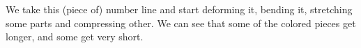 \documentclass[]{standalone}
\begin{document}
\begin{minipage}{30ex}
    We take this (piece of) number line and start deforming it, bending it,
    stretching some parts and compressing other.  We can see that some of the
    colored pieces get longer, and some get very short.
\end{minipage}
\end{document}
